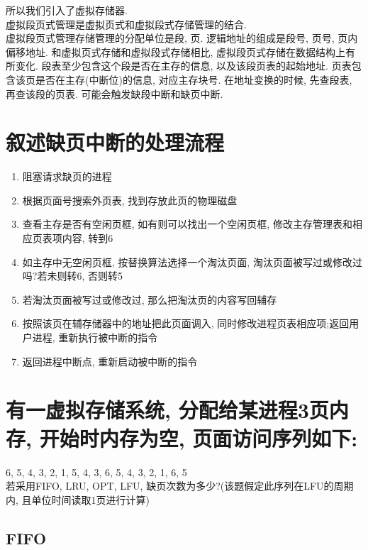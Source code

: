 \documentclass[a4paper, 12pt, notitlepage]{article}
\begin{document}
	所以我们引入了虚拟存储器. \\
	
	虚拟段页式管理是虚拟页式和虚拟段式存储管理的结合. \\
	
	虚拟段页式管理存储管理的分配单位是段, 页. 逻辑地址的组成是段号, 页号, 页内偏移地址. 和虚拟页式存储和虚拟段式存储相比, 虚拟段页式存储在数据结构上有所变化. 段表至少包含这个段是否在主存的信息, 以及该段页表的起始地址. 页表包含该页是否在主存(中断位)的信息, 对应主存块号. 在地址变换的时候, 先查段表, 再查该段的页表. 可能会触发缺段中断和缺页中断. 

\section{叙述缺页中断的处理流程}

\begin{enumerate}
	\item 阻塞请求缺页的进程
	\item 根据页面号搜索外页表, 找到存放此页的物理磁盘
	\item 查看主存是否有空闲页框, 如有则可以找出一个空闲页框, 修改主存管理表和相应页表项内容, 转到6
	\item 如主存中无空闲页框, 按替换算法选择一个淘汰页面, 淘汰页面被写过或修改过吗?若未则转6, 否则转5
	\item 若淘汰页面被写过或修改过, 那么把淘汰页的内容写回辅存
	\item 按照该页在辅存储器中的地址把此页面调入, 同时修改进程页表相应项;返回用户进程, 重新执行被中断的指令
	\item 返回进程中断点, 重新启动被中断的指令
\end{enumerate}

\section{有一虚拟存储系统, 分配给某进程3页内存, 开始时内存为空, 页面访问序列如下: }

	6, 5, 4, 3, 2, 1, 5, 4, 3, 6, 5, 4, 3, 2, 1, 6, 5 \\
	
	若采用FIFO, LRU, OPT, LFU, 缺页次数为多少?(该题假定此序列在LFU的周期内, 且单位时间读取1页进行计算) \\
		
\subsection{FIFO}
\end{document}
